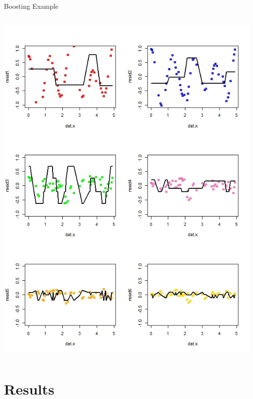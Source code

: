 \documentclass{beamer}
\begin{document}
\begin{frame}{Boosting Example}
\begin{columns}
\begin{column}{0.6\textwidth}
				\includegraphics[scale=0.37]{boostex.jpeg}
			\end{column}
		\end{columns}
	\end{frame}
	
	\section{Results}
	
\end{document}
